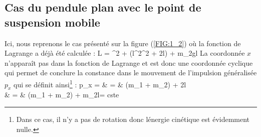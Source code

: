 \subsection{Cas du pendule plan avec le point de suspension mobile}

Ici, nous reprenons le cas pr\'esent\'e sur la figure (\ref{FIG:1_2}) o\`u la fonction de Lagrange a d\'ej\`a \'et\'e calcul\'ee :
\be
	L = ^{2} + \left(l^{2}\dot{\varphi}^{2} + 2l\cos\varphi{}\dot{\varphi}\right) + m_{2}gl\cos\varphi
\ee
La coordonn\'ee $x$ n'appara\^it pas dans la fonction de Lagrange et est donc une coordonn\'ee cyclique qui permet de conclure la constance dans le mouvement de l'impulsion g\'en\'eralis\'ee $p_{x}$ qui se d\'efinit ainsi\footnote{Dans ce cas, il n'y a pas de rotation donc l\'energie cin\'etique est \'evidemment nulle.} :
\bea
	p_{x} =  & = & (m_{1} + m_{2}) + 2l\dot{\varphi}\cos\varphi \nonumber \\
	& = & (m_{1} + m_{2}) + m_{2}l\dot{\varphi}\cos\varphi = cste
\eea

